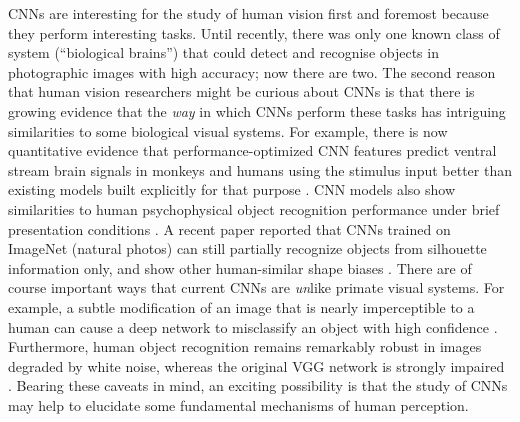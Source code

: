 \documentclass[doc, 11pt,a4paper,natbib]{apa6}\usepackage[]{graphicx}\usepackage[]{color}
\begin{document}
CNNs are interesting for the study of human vision first and foremost because they perform interesting tasks. 
Until recently, there was only one known class of system (``biological brains'') that could detect and recognise objects in photographic images with high accuracy; now there are two.
The second reason that human vision researchers might be curious about CNNs is that there is growing evidence that the \textit{way} in which CNNs perform these tasks has  intriguing similarities to some biological visual systems.
For example, there is now quantitative evidence that performance-optimized CNN features predict ventral stream brain signals in monkeys and humans using the stimulus input better than existing models built explicitly for that purpose
\citep{cadieu_deep_2014, yamins_performanceoptimized_2014, yamins_hierarchical_2013, khaligh-razavi_deep_2014, cichy_dynamics_2016, cichy_comparison_2016, guclu_deep_2015, hong_explicit_2016}.
CNN models also show similarities to human psychophysical object recognition performance under brief presentation conditions \citep{hong_explicit_2016, yamins_performanceoptimized_2014}. 
A recent paper reported that CNNs trained on ImageNet (natural photos) can still partially recognize objects from silhouette information only, and show other human-similar shape biases \citep{kubilius_deep_2016}.
There are of course important ways that current CNNs are \textit{un}like primate visual systems. 
For example, a subtle modification of an image that is nearly imperceptible to a human can cause a deep network to misclassify an object with high confidence \citep[][see \citet{yamins_using_2016} for additional discussion]{szegedy_intriguing_2013}.
Furthermore, human object recognition remains remarkably robust in images degraded by white noise, whereas the original VGG network is strongly impaired \citep{geirhos_comparing_2017}.
Bearing these caveats in mind, an exciting possibility is that the study of CNNs may help to elucidate some fundamental mechanisms of human perception.
\end{document}
